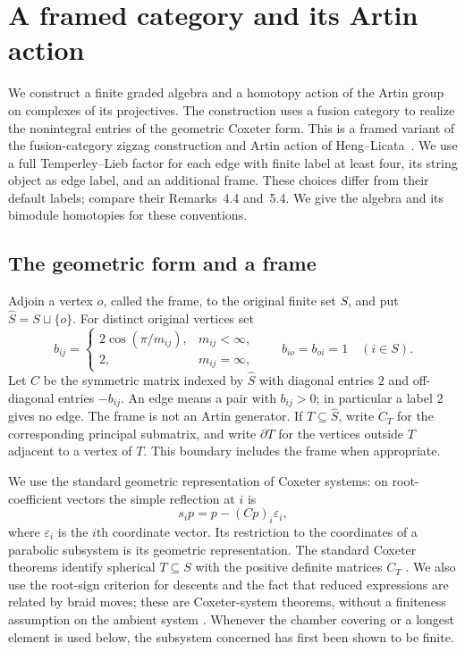 \section{A framed category and its Artin action}
\label{sec:category}

We construct a finite graded algebra and a homotopy action of the Artin
group on complexes of its projectives. The construction uses a fusion
category to realize the nonintegral entries of the geometric Coxeter
form.  This is a framed variant of the fusion-category zigzag construction
and Artin action of Heng--Licata~\cite[Sections~4--5]{HengLicata2024}.
We use a full Temperley--Lieb factor for each edge with finite label
at least four, its string
object as edge label, and an additional frame.  These choices differ
from their default labels; compare their Remarks~4.4 and~5.4.
We give the algebra and its bimodule homotopies for these conventions.

\subsection{The geometric form and a frame}

Adjoin a vertex $o$, called the frame, to the original finite set $S$,
and put $\widehat S=S\sqcup\{o\}$. For distinct original vertices set
\[
 b_{ij}=\begin{cases}
 2\cos(\pi/m_{ij}),&m_{ij}<\infty,\\
 2,&m_{ij}=\infty,
 \end{cases}
 \qquad b_{io}=b_{oi}=1\quad(i\in S).
\]
Let $C$ be the symmetric matrix indexed by $\widehat S$ with diagonal
entries $2$ and off-diagonal entries $-b_{ij}$. An edge means a pair with
$b_{ij}>0$; in particular a label $2$ gives no edge. The frame is not an
Artin generator. If $T\subseteq\widehat S$, write $C_T$ for the
corresponding principal submatrix, and write $\partial T$ for the vertices
outside $T$ adjacent to a vertex of $T$. This boundary includes the frame
when appropriate.

We use the standard geometric representation of Coxeter systems: on
root-coefficient vectors the simple reflection at $i$ is
\begin{equation}
 s_i p=p-(Cp)_i\varepsilon_i,
 \label{eq:category-reflection}
\end{equation}
where $\varepsilon_i$ is the $i$th coordinate vector. Its restriction to
the coordinates of a parabolic subsystem is its geometric
representation. The standard Coxeter theorems identify spherical
$T\subseteq S$ with the positive definite matrices $C_T$
\cite[Chapter~V, \S4, no.~8, Theorem~2]{Bourbaki2002}. We also use
the root-sign criterion for descents and the fact that reduced
expressions are related by braid moves; these are Coxeter-system
theorems, without a finiteness assumption on the ambient system
\cite[Chapter~IV, \S1; Chapter~V, \S4, nos.~4 and~6]{Bourbaki2002}.
Whenever the chamber covering or a
longest element is used below, the subsystem concerned has first been
shown to be finite.

